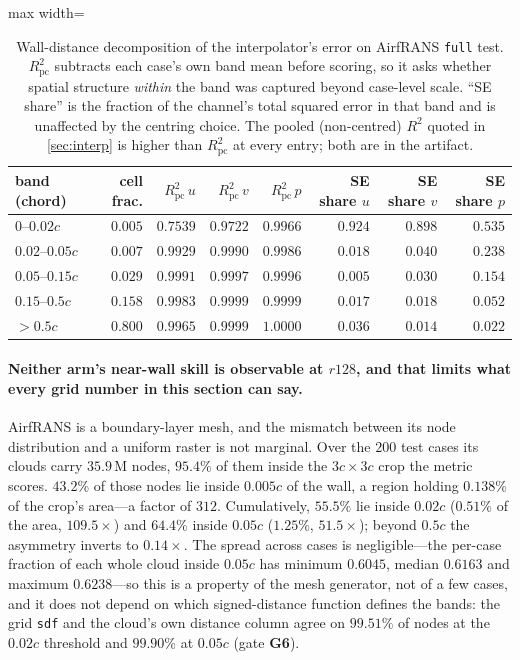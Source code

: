 \begin{table}[t]
\centering
\small
\caption{Wall-distance decomposition of the interpolator's error on AirfRANS
\texttt{full} test. $R^2_{\mathrm{pc}}$ subtracts each case's own band mean before
scoring, so it asks whether spatial structure \emph{within} the band was captured
beyond case-level scale. ``SE share'' is the fraction of the channel's total squared
error in that band and is unaffected by the centring choice. The pooled (non-centred)
$R^2$ quoted in \autoref{sec:interp} is higher than $R^2_{\mathrm{pc}}$ at every entry;
both are in the artifact.}
\label{tab:interp_bands}
\begin{adjustbox}{max width=\textwidth}
\begin{tabular}{l r r r r r r r}
\toprule
band (chord) & cell frac. & $R^2_{\mathrm{pc}}\,u$ & $R^2_{\mathrm{pc}}\,v$ & $R^2_{\mathrm{pc}}\,p$ & SE share $u$ & SE share $v$ & SE share $p$ \\
\midrule
$0$--$0.02c$ & $0.005$ & $0.7539$ & $0.9722$ & $0.9966$ & $\mathbf{0.924}$ & $\mathbf{0.898}$ & $0.535$ \\
$0.02$--$0.05c$ & $0.007$ & $0.9929$ & $0.9990$ & $0.9986$ & $0.018$ & $0.040$ & $0.238$ \\
$0.05$--$0.15c$ & $0.029$ & $0.9991$ & $0.9997$ & $0.9996$ & $0.005$ & $0.030$ & $0.154$ \\
$0.15$--$0.5c$ & $0.158$ & $0.9983$ & $0.9999$ & $0.9999$ & $0.017$ & $0.018$ & $0.052$ \\
$>0.5c$ & $0.800$ & $0.9965$ & $0.9999$ & $1.0000$ & $0.036$ & $0.014$ & $0.022$ \\
\bottomrule
\end{tabular}
\end{adjustbox}
\end{table}

\paragraph{Neither arm's near-wall skill is observable at $r128$, and that limits what
every grid number in this section can say.} AirfRANS is a boundary-layer mesh, and the mismatch between its
node distribution and a uniform raster is not marginal. Over the $200$ test cases its
clouds carry $35.9$\,M nodes, $95.4\%$ of them inside the $3c{\times}3c$ crop the metric
scores. $43.2\%$ of those nodes lie inside $0.005c$ of the wall, a region holding
$0.138\%$ of the crop's area---a factor of $312$. Cumulatively, $55.5\%$ lie inside
$0.02c$ ($0.51\%$ of the area, $109.5\times$) and $64.4\%$ inside $0.05c$ ($1.25\%$,
$51.5\times$); beyond $0.5c$ the asymmetry inverts to $0.14\times$. The spread across
cases is negligible---the per-case fraction of each whole cloud inside $0.05c$ has minimum
$0.6045$, median $0.6163$ and maximum $0.6238$---so this is a property of the mesh generator, not of a few
cases, and it does not depend on which signed-distance function defines the bands: the
grid \texttt{sdf} and the cloud's own distance column agree on $99.51\%$ of nodes at the
$0.02c$ threshold and $99.90\%$ at $0.05c$ (gate \textbf{G6}).

